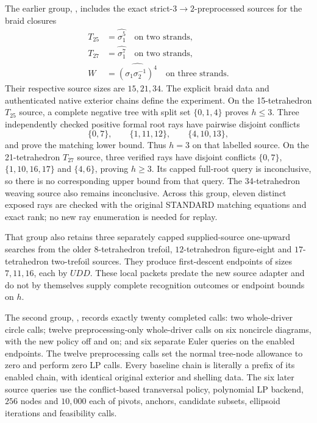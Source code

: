 The earlier group, , includes the exact
strict-$3\to2$-preprocessed sources for the braid closures
\[
 \begin{split}
 T_{25}&=\widehat{\sigma_1^5}\quad\text{on two strands},\\
 T_{27}&=\widehat{\sigma_1^7}\quad\text{on two strands},\\
 W&=\widehat{(\sigma_1\sigma_2^{-1})^4}
                         \quad\text{on three strands}.
 \end{split}
\]
Their respective source sizes are $15,21,34$.  The explicit braid data
and authenticated native exterior chains define the experiment.  On the
15-tetrahedron $T_{25}$ source, a complete negative tree with split set
$\{0,1,4\}$ proves $h\le3$.  Three independently checked positive
formal root rays have pairwise disjoint conflicts
\[
             \{0,7\},\qquad\{1,11,12\},\qquad\{4,10,13\},
\]
and prove the matching lower bound.  Thus $h=3$ on that labelled source.
On the 21-tetrahedron $T_{27}$ source, three verified rays have disjoint
conflicts $\{0,7\}$, $\{1,10,16,17\}$ and $\{4,6\}$, proving $h\ge3$.
Its capped full-root query is inconclusive, so there is no corresponding
upper bound from that query.  The 34-tetrahedron weaving source also
remains inconclusive.  Across this group, eleven distinct exposed rays
are checked with the original STANDARD matching equations and exact
rank; no new ray enumeration is needed for replay.

That group also retains three separately capped supplied-source
one-upward searches from the older $8$-tetrahedron trefoil,
$12$-tetrahedron figure-eight and $17$-tetrahedron two-trefoil sources.
They produce first-descent endpoints of sizes $7,11,16$, each by $UDD$.
These local packets predate the new source adapter and do not by
themselves supply complete recognition outcomes or endpoint bounds on $h$.

The second group, , records exactly twenty
completed calls: two whole-driver circle calls; twelve preprocessing-only
whole-driver calls on six noncircle diagrams, with the new policy off
and on; and six separate Euler queries on the enabled endpoints.
The twelve preprocessing calls set the normal tree-node allowance to
zero and perform zero LP calls.  Every baseline chain is literally a
prefix of its enabled chain, with identical original exterior and
shelling data.  The six later source queries use the conflict-based
transversal policy, polynomial LP backend, $256$ nodes and $10{,}000$
each of pivots, anchors, candidate subsets, ellipsoid iterations and
feasibility calls.

